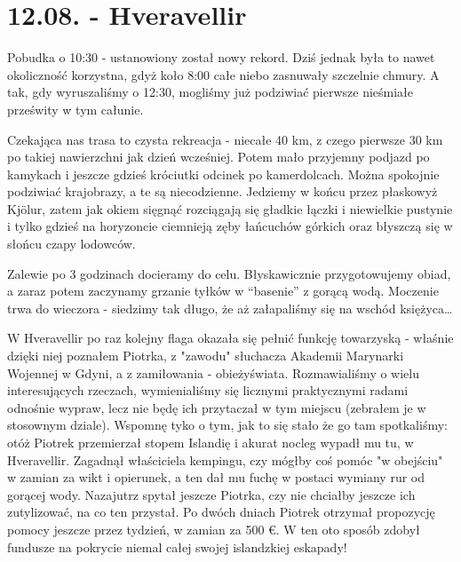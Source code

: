 \chapter*{12.08. - Hveravellir}

Pobudka o 10:30 - ustanowiony został nowy rekord. Dziś jednak była to nawet okoliczność korzystna, gdyż koło 8:00 całe niebo zasnuwały szczelnie chmury. A tak, gdy wyruszaliśmy o 12:30, mogliśmy już podziwiać pierwsze nieśmiałe prześwity w tym całunie.

Czekająca nas trasa to czysta rekreacja - niecałe 40 km, z czego pierwsze 30 km po takiej nawierzchni jak dzień wcześniej. Potem mało przyjemny podjazd po kamykach i jeszcze gdzieś króciutki odcinek po kamerdolcach. Można spokojnie podziwiać krajobrazy, a te są niecodzienne. Jedziemy w końcu przez płaskowyż Kjölur, zatem jak okiem sięgnąć rozciągają się gładkie łączki i niewielkie pustynie i tylko gdzieś na horyzoncie ciemnieją zęby łańcuchów górkich oraz błyszczą się w słońcu czapy lodowców.

Zalewie po 3 godzinach docieramy do celu. Błyskawicznie przygotowujemy obiad, a zaraz potem  zaczynamy grzanie tyłków w “basenie” z gorącą wodą. Moczenie trwa do wieczora - siedzimy tak długo, że aż załapaliśmy się na wschód księżyca…

W Hveravellir po raz kolejny flaga okazała się pełnić funkcję towarzyską - właśnie dzięki niej poznałem Piotrka, z "zawodu" słuchacza Akademii Marynarki Wojennej w Gdyni, a z zamiłowania - obieżyświata. Rozmawialiśmy o wielu interesujących rzeczach, wymienialiśmy się licznymi praktycznymi radami odnośnie wypraw, lecz nie będę ich przytaczał w tym miejscu (zebrałem je w stosownym dziale). Wspomnę tyko o tym, jak to się stało że go tam spotkaliśmy: otóż Piotrek przemierzał stopem Islandię i akurat nocleg wypadł mu tu, w Hveravellir. Zagadnął właściciela kempingu, czy mógłby coś pomóc "w obejściu" w zamian za wikt i opierunek, a ten dał mu fuchę w postaci wymiany rur od gorącej wody. Nazajutrz spytał jeszcze Piotrka, czy nie chciałby jeszcze ich zutylizować, na co ten przystał. Po dwóch dniach Piotrek otrzymał propozycję pomocy jeszcze przez tydzień, w zamian za 500 €. W ten oto sposób zdobył fundusze na pokrycie niemal całej swojej islandzkiej eskapady!


